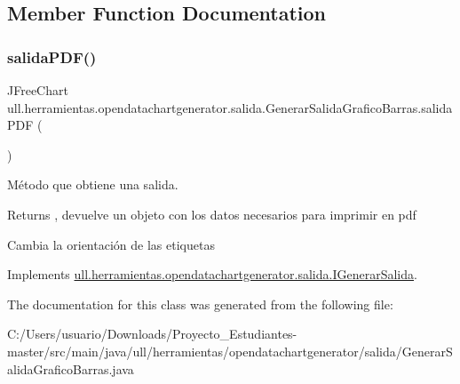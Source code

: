 \subsection{Member Function Documentation}
\mbox{\label{classull_1_1herramientas_1_1opendatachartgenerator_1_1salida_1_1_generar_salida_grafico_barras_a1b5419dd7233660c7487f6b4f218854c}} 
\subsubsection{\texorpdfstring{salida\+P\+D\+F()}{salidaPDF()}}
{\footnotesize\ttfamily J\+Free\+Chart ull.\+herramientas.\+opendatachartgenerator.\+salida.\+Generar\+Salida\+Grafico\+Barras.\+salida\+P\+DF (\begin{DoxyParamCaption}{ }\end{DoxyParamCaption})}



Método que obtiene una salida. 

\begin{DoxyReturn}{Returns}
, devuelve un objeto con los datos necesarios para imprimir en pdf 
\end{DoxyReturn}
Cambia la orientación de las etiquetas 

Implements \mbox{\hyperlink{interfaceull_1_1herramientas_1_1opendatachartgenerator_1_1salida_1_1_i_generar_salida_ac79d306ba661c9ee5375874289a3aa26}{ull.\+herramientas.\+opendatachartgenerator.\+salida.\+I\+Generar\+Salida}}.



The documentation for this class was generated from the following file\+:\begin{DoxyCompactItemize}
\item 
C\+:/\+Users/usuario/\+Downloads/\+Proyecto\+\_\+\+Estudiantes-\/master/src/main/java/ull/herramientas/opendatachartgenerator/salida/Generar\+Salida\+Grafico\+Barras.\+java\end{DoxyCompactItemize}
